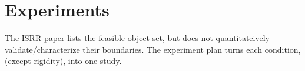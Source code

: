 \documentclass[10pt, conference]{IEEEtran}
\newcommand{\sh}[1]{\textcolor{orange!90!black}{\textbf{SH:} #1}}
\begin{document}

\section{Experiments}

The ISRR paper lists the feasible object set, but does not quantitateively validate/characterize their boundaries. The experiment plan turns each condition, (except rigidity), into one study.
\end{document}
